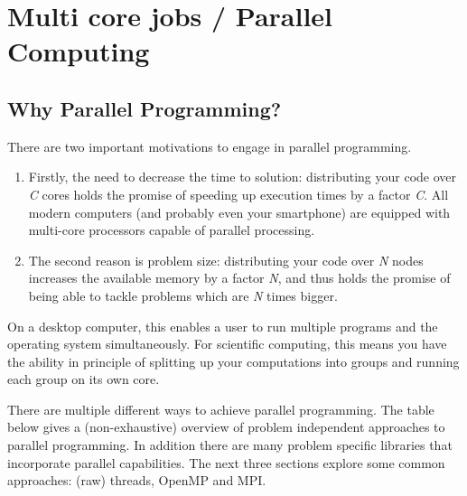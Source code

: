 \chapter{Multi core jobs / Parallel Computing}

\section{Why Parallel Programming?}

There are two important motivations to engage in parallel programming.

\begin{enumerate}

\item  Firstly, the need to decrease the time to solution: distributing your
  code over \emph{C} cores holds the promise of speeding up execution times
  by a factor \emph{C}. All modern computers (and probably even your
  smartphone) are equipped with multi-core processors capable of parallel
  processing.
\item  The second reason is problem size: distributing your code over
  \emph{N} nodes increases the available memory by a factor \emph{N}, and
  thus holds the promise of being able to tackle problems which are \emph{N}
  times bigger.
\end{enumerate}

On a desktop computer, this enables a user to run multiple programs and the
operating system simultaneously. For scientific computing, this means you have
the ability in principle of splitting up your computations into groups and
running each group on its own core.

There are multiple different ways to achieve parallel programming. The table
below gives a (non-exhaustive) overview of problem independent approaches to
parallel programming. In addition there are many problem specific libraries
that incorporate parallel capabilities. The next three sections explore some
common approaches: (raw) threads, OpenMP and MPI.

